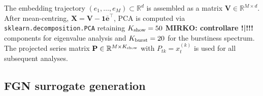 \documentclass[12pt,a4paper]{article}
\newcommand{\bk}{B_k}
\newcommand{\xtk}{x_t^{(k)}}
\newcommand{\ebar}{\bar{\mathbf{e}}}
\newcommand{\R}{\mathbb{R}}
\newcommand{\CV}{\mathrm{CV}}
\begin{document}
The embedding trajectory $(e_1, \ldots, e_M) \subset \R^d$ is
assembled as a matrix $\mathbf{V} \in \R^{M \times d}$.
After mean-centring, $\mathbf{X} = \mathbf{V} - \mathbf{1}\ebar^\top$,
PCA is computed via \texttt{sklearn.decomposition.PCA} retaining
$K_{\rm show} = 50$ {\bf{MIRKO: controllare !|!!!}} components for eigenvalue analysis and
$K_{\rm burst} = 20$ for the burstiness spectrum.
The projected series matrix $\mathbf{P} \in \R^{M \times K_{\rm show}}$
with $P_{tk} = \xtk$ is used for all subsequent analyses.

%
%
%
%
%
%
\subsection{FGN surrogate generation}
\label{sec:fgn_pipeline}
\end{document}
